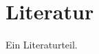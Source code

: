 \documentclass[../Abschlussarbeit.tex]{subfiles}
\begin{document}
\section{Literatur}
Ein Literaturteil.
\end{document}
